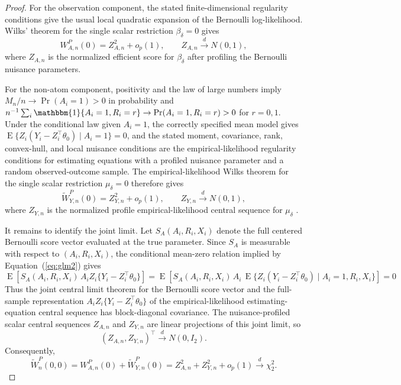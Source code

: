 \documentclass[11pt]{article}
\DeclareMathOperator*{\E}{E}
\begin{document}
\begin{proof}
For the observation component, the stated finite-dimensional regularity conditions give the usual local quadratic expansion of the Bernoulli log-likelihood. Wilks' theorem for the single scalar restriction $\beta_\delta=0$ gives
\[
  W_{A,n}^P(0)=Z_{A,n}^2+o_p(1),
  \qquad
  Z_{A,n}\overset{d}{\longrightarrow}N(0,1),
\]
where $Z_{A,n}$ is the normalized efficient score for $\beta_\delta$ after profiling the Bernoulli nuisance parameters.

For the non-atom component, positivity and the law of large numbers imply $M_n/n\to\Pr(A_i=1)>0$ in probability and $n^{-1}\sum_i\mathbbm{1}\{A_i=1,R_i=r\}\to\Pr(A_i=1,R_i=r)>0$ for $r=0,1$. Under the conditional law given $A_i=1$, the correctly specified mean model gives $\E\{Z_i(Y_i-Z_i^\top\theta_0)\mid A_i=1\}=0$, and the stated moment, covariance, rank, convex-hull, and local nuisance conditions are the empirical-likelihood regularity conditions for estimating equations with a profiled nuisance parameter and a random observed-outcome sample. The empirical-likelihood Wilks theorem for the single scalar restriction $\mu_\delta=0$ therefore gives
\[
  \widetilde{W}_{Y,n}^P(0)=Z_{Y,n}^2+o_p(1),
  \qquad
  Z_{Y,n}\overset{d}{\longrightarrow}N(0,1),
\]
where $Z_{Y,n}$ is the normalized profile empirical-likelihood central sequence for $\mu_\delta$ \citep{owen1991empirical,qin1994empirical}.

It remains to identify the joint limit. Let $S_A(A_i,R_i,X_i)$ denote the full centered Bernoulli score vector evaluated at the true parameter. Since $S_A$ is measurable with respect to $(A_i,R_i,X_i)$, the conditional mean-zero relation implied by Equation~(\ref{eq:glm2}) gives
\[
  \E\!\left[
    S_A(A_i,R_i,X_i)\,
    A_i Z_i\{Y_i-Z_i^\top\theta_0\}
  \right]
  =
  \E\!\left[
    S_A(A_i,R_i,X_i)\,
    A_i\,\E\{Z_i(Y_i-Z_i^\top\theta_0)\mid A_i=1,R_i,X_i\}
  \right]
  =0
\]
Thus the joint central limit theorem for the Bernoulli score vector and the full-sample representation $A_iZ_i\{Y_i-Z_i^\top\theta_0\}$ of the empirical-likelihood estimating-equation central sequence has block-diagonal covariance. The nuisance-profiled scalar central sequences $Z_{A,n}$ and $Z_{Y,n}$ are linear projections of this joint limit, so
\[
  (Z_{A,n},Z_{Y,n})^\top
  \overset{d}{\longrightarrow}N(0,I_2).
\]
Consequently,
\[
  \widetilde{W}_n^P(0,0)
  =
  W_{A,n}^P(0)+\widetilde{W}_{Y,n}^P(0)
  =
  Z_{A,n}^2+Z_{Y,n}^2+o_p(1)
  \overset{d}{\longrightarrow}\chi^2_2 .
\]
\end{proof}
\end{document}
